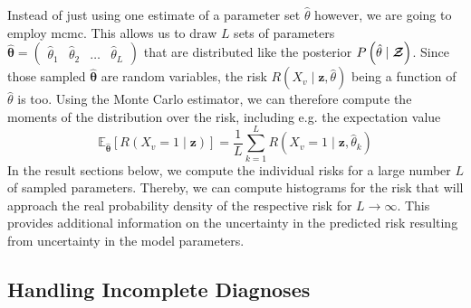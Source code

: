 \documentclass[\relativeRoot/main.tex]{subfiles}
\begin{document}
Instead of just using one estimate of a parameter set $\hat{\theta}$ however, we are going to employ \gls{mcmc}. This allows us to draw $L$ sets of parameters $\boldsymbol{\hat{\theta}} = \begin{pmatrix} \hat{\theta}_1 & \hat{\theta}_2 & \ldots & \hat{\theta}_L \end{pmatrix}$ that are distributed like the posterior $P \left( \hat{\theta} \mid \boldsymbol{\mathcal{Z}} \right)$. Since those sampled $\boldsymbol{\hat{\theta}}$ are random variables, the risk $R \left( X_v \mid \mathbf{z}, \hat{\theta} \right)$ being a function of $\hat{\theta}$ is too. Using the Monte Carlo estimator, we can therefore compute the moments of the distribution over the risk, including e.g. the expectation value
%
\begin{equation}
    \mathbb{E}_{\boldsymbol{\hat{\theta}}} \left[ R \left( X_v = 1 \mid \mathbf{z} \right) \right] = \frac{1}{L} \sum_{k=1}^{L}{R \left( X_v = 1 \mid \mathbf{z}, \hat{\theta}_k \right)}
\end{equation}
%
In the result sections below, we compute the individual risks for a large number $L$ of sampled parameters. Thereby, we can compute histograms for the risk that will approach the real probability density of the respective risk for $L \rightarrow \infty$. This provides additional information on the uncertainty in the predicted risk resulting from uncertainty in the model parameters.

\subsection{Handling Incomplete Diagnoses}
\label{subsec:unilateral:formalism:incomplete_diagnose}
\end{document}
